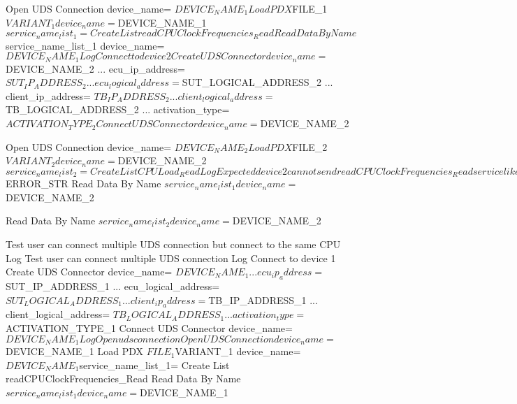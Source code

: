 \begin{robotcode}
    Open UDS Connection    device_name= ${DEVICE_NAME_1}
    Load PDX    ${FILE_1}    ${VARIANT_1}    device_name= ${DEVICE_NAME_1}
    ${service_name_list_1}=    Create List    readCPUClockFrequencies_Read
    Read Data By Name    ${service_name_list_1}    device_name= ${DEVICE_NAME_1}

    Log    Connect to device 2
    Create UDS Connector    device_name= ${DEVICE_NAME_2}
    ...                     ecu_ip_address= ${SUT_IP_ADDRESS_2}
    ...                     ecu_logical_address= ${SUT_LOGICAL_ADDRESS_2}
    ...                     client_ip_address= ${TB_IP_ADDRESS_2}
    ...                     client_logical_address= ${TB_LOGICAL_ADDRESS_2}
    ...                     activation_type= ${ACTIVATION_TYPE_2}
    Connect UDS Connector    device_name= ${DEVICE_NAME_2}

    Open UDS Connection    device_name= ${DEVICE_NAME_2}
    Load PDX    ${FILE_2}    ${VARIANT_2}    device_name= ${DEVICE_NAME_2}
    ${service_name_list_2}=    Create List    CPULoad_Read
    Log    Expected device 2 cannot send readCPUClockFrequencies_Read service like device 1
    Run Keyword And Expect Error    ${ERROR_STR}    Read Data By Name    ${service_name_list_1}    device_name= ${DEVICE_NAME_2}

    Read Data By Name    ${service_name_list_2}    device_name= ${DEVICE_NAME_2}

Test user can connect multiple UDS connection but connect to the same CPU
    Log    Test user can connect multiple UDS connection
    Log    Connect to device 1
    Create UDS Connector    device_name= ${DEVICE_NAME_1}
    ...                     ecu_ip_address= ${SUT_IP_ADDRESS_1}
    ...                     ecu_logical_address= ${SUT_LOGICAL_ADDRESS_1}
    ...                     client_ip_address= ${TB_IP_ADDRESS_1}
    ...                     client_logical_address= ${TB_LOGICAL_ADDRESS_1}
    ...                     activation_type= ${ACTIVATION_TYPE_1}
    Connect UDS Connector    device_name= ${DEVICE_NAME_1}
    
    Log    Open uds connection
    Open UDS Connection    device_name= ${DEVICE_NAME_1}
    Load PDX    ${FILE_1}    ${VARIANT_1}    device_name= ${DEVICE_NAME_1}
    ${service_name_list_1}=    Create List    readCPUClockFrequencies_Read
    Read Data By Name    ${service_name_list_1}    device_name= ${DEVICE_NAME_1}


\end{robotcode}
